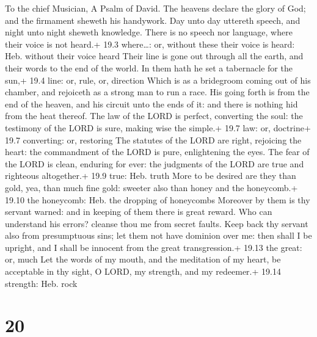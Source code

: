 To the chief Musician, A Psalm of David.  The heavens
declare the glory of God; and the firmament sheweth his handywork.
 Day unto day uttereth speech, and night unto night sheweth
knowledge.  There is no speech nor language, where their
voice is not heard.+ 19.3 where\ldots: or, without these their voice is
heard: Heb. without their voice heard  Their line is gone
out through all the earth, and their words to the end of the world. In
them hath he set a tabernacle for the sun,+ 19.4 line: or, rule, or,
direction  Which is as a bridegroom coming out of his
chamber, and rejoiceth as a strong man to run a race.  His
going forth is from the end of the heaven, and his circuit unto the ends
of it: and there is nothing hid from the heat thereof.  The
law of the LORD is perfect, converting the soul: the testimony of the
LORD is sure, making wise the simple.+ 19.7 law: or, doctrine+ 19.7
converting: or, restoring  The statutes of the LORD are
right, rejoicing the heart: the commandment of the LORD is pure,
enlightening the eyes.  The fear of the LORD is clean,
enduring for ever: the judgments of the LORD are true and righteous
altogether.+ 19.9 true: Heb. truth  More to be desired are
they than gold, yea, than much fine gold: sweeter also than honey and
the honeycomb.+ 19.10 the honeycomb: Heb. the dropping of honeycombs
 Moreover by them is thy servant warned: and in keeping of
them there is great reward.  Who can understand his errors?
cleanse thou me from secret faults.  Keep back thy servant
also from presumptuous sins; let them not have dominion over me: then
shall I be upright, and I shall be innocent from the great
transgression.+ 19.13 the great: or, much  Let the words of
my mouth, and the meditation of my heart, be acceptable in thy sight, O
LORD, my strength, and my redeemer.+ 19.14 strength: Heb. rock

\hypertarget{section-19}{%
\section{20}\label{section-19}}

